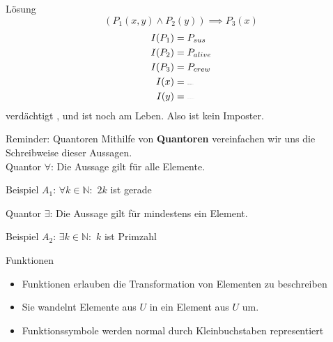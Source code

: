 {\begin{frame}{Lösung}
	$$(P_1(x,y) \wedge P_2(y)) \implies P_3(x)$$
	\begin{align*}
		I(P_1) & = P_{sus}       \\
		I(P_2) & = P_{alive}     \\
		I(P_3) & = P_{crew}      \\
		I(x)   & = \sus{white}   \\
		I(y)   & = \sus{magenta}
	\end{align*}
	 verdächtigt , und  ist noch am Leben. Also ist  kein Imposter.
\end{frame}
}



\begin{frame}[fragile]{Reminder: Quantoren}
	Mithilfe von \textbf{Quantoren} vereinfachen wir uns die Schreibweise dieser Aussagen.\\
	\vspace{0.5cm}
	Quantor \alert{$\forall$}: Die Aussage gilt für alle Elemente.\\
	\begin{exampleblock}{Beispiel}
		$A_1$: $\forall k \in \mathbb{N}:$ $2k$ ist gerade
	\end{exampleblock}
	Quantor \alert{$\exists$}: Die Aussage gilt für mindestens ein Element.\\
	\begin{exampleblock}{Beispiel}
		$A_2$: $\exists k \in \mathbb{N}:$ $k$ ist Primzahl
	\end{exampleblock}
\end{frame}

\begin{frame}{Funktionen}
	\begin{itemize}
		\item Funktionen erlauben die \alert{Transformation von Elementen} zu beschreiben
		\item<2-> Sie wandelnt Elemente aus $U$ in ein Element aus $U$ um.
		\item<3-> Funktionssymbole werden normal durch Kleinbuchstaben representiert
	\end{itemize}

\end{frame}

